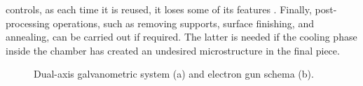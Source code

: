 controls, as each time it is reused, it loses some of its features \cite{strondl_characterization_2015}. Finally, post-processing operations, such as removing supports, surface finishing, and annealing, can be carried out if required. The latter is needed if the cooling phase inside the chamber has created an undesired microstructure in the final piece.
\begin{figure}
    \centering
    \quad
    \caption[Galvanometric system and electron gun.]{Dual-axis galvanometric system (a) and electron gun schema (b).}
\end{figure}


